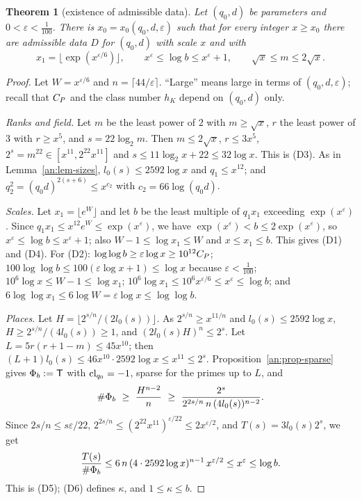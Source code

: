 \documentclass[10pt]{amsart}
\newtheorem{theorem}{Theorem}[section]
\theoremstyle{definition}
\theoremstyle{remark}
\begin{document}
\begin{theorem}[existence of admissible data]\label{an:thm-data}
Let $(q_0,d)$ be parameters and $0<\varepsilon<\frac1{100}$. There is
$x_0=x_0(q_0,d,\varepsilon)$ such that for every integer $x\ge x_0$ there are
admissible data $D$ for $(q_0,d)$ with scale $x$ and with
\[
 x_1=\bigl\lfloor\exp(x^{\varepsilon/6})\bigr\rfloor,\qquad x^{\varepsilon}\le\log b\le x^{\varepsilon}+1,\qquad\sqrt x\le m\le2\sqrt x .
\]
\end{theorem}
\begin{proof}
Let $W=x^{\varepsilon/6}$ and $n=\lceil44/\varepsilon\rceil$. ``Large''
means large in terms of $(q_0,d,\varepsilon)$; recall that $C_P$ and the
class number $h_K$ depend on $(q_0,d)$ only.

\emph{Ranks and field.} Let $m$ be the least power of $2$ with $m\ge\sqrt x$,
$r$ the least power of $3$ with $r\ge x^{5}$, and $s=22\log_2m$. Then
$m\le2\sqrt x$, $r\le3x^{5}$, $2^{s}=m^{22}\in[x^{11},2^{22}x^{11}]$ and
$s\le11\log_2x+22\le32\log x$. This is (D3). As in
Lemma~\ref{an:lem-sizes}, $l_0(s)\le2592\log x$ and $q_1\le x^{12}$; and
$q_2^{2}=(q_0d)^{2(s+6)}\le x^{c_2}$ with $c_2=66\log(q_0d)$.

\emph{Scales.} Let $x_1=\lfloor e^{W}\rfloor$ and let $b$ be the least
multiple of $q_1x_1$ exceeding $\exp(x^{\varepsilon})$. Since
$q_1x_1\le x^{12}e^{W}\le\exp(x^{\varepsilon})$, we have
$\exp(x^\varepsilon)<b\le2\exp(x^{\varepsilon})$, so
$x^{\varepsilon}\le\log b\le x^{\varepsilon}+1$; also
$W-1\le\log x_1\le W$ and $x\le x_1\le b$. This gives (D1) and (D4). For
(D2): $\log\log b\ge\varepsilon\log x\ge10^{12}C_P$;
$100\log\log b\le100(\varepsilon\log x+1)\le\log x$ because
$\varepsilon<\frac1{100}$; $10^{6}\log x\le W-1\le\log x_1$;
$10^{6}\log x_1\le10^{6}x^{\varepsilon/6}\le x^{\varepsilon}\le\log b$;
and $6\log\log x_1\le6\log W=\varepsilon\log x\le\log\log b$.

\emph{Places.} Let $H=\lfloor2^{s/n}/(2l_0(s))\rfloor$. As
$2^{s/n}\ge x^{11/n}$ and $l_0(s)\le2592\log x$, $H\ge2^{s/n}/(4l_0(s))\ge1$,
and $(2l_0(s)H)^{n}\le2^{s}$. Let $L=5r(r+1-m)\le45x^{10}$; then
$(L+1)l_0(s)\le46x^{10}\cdot2592\log x\le x^{11}\le2^{s}$.
Proposition~\ref{an:prop-sparse} gives $\Phi_b:=\mathsf T$ with
$\mathrm{cl}_{q_0}=-1$, sparse for the primes up to $L$, and
\[
 \#\anPb\ \ge\ \frac{H^{n-2}}n\ \ge\ \frac{2^{s}}{2^{2s/n}\,n\,(4l_0(s))^{n-2}} .
\]
Since $2s/n\le s\varepsilon/22$, $2^{2s/n}\le(2^{22}x^{11})^{\varepsilon/22}\le2x^{\varepsilon/2}$,
and $T(s)=3l_0(s)2^{s}$, we get
\[
 \frac{T(s)}{\#\Phi_b}\le6\,n\,(4\cdot2592\log x)^{n-1}\,x^{\varepsilon/2}\le x^{\varepsilon}\le\log b .
\]
This is (D5); (D6) defines $\kappa$, and $1\le\kappa\le b$.


\end{proof}
\end{document}
